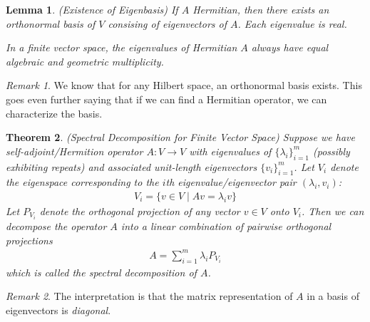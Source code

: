 \documentclass[12pt]{book}
\numberwithin{equation}{section} %
\theoremstyle{plain}
\newtheorem{thm}{Theorem}[section]
\newtheorem{lem}[thm]{Lemma}
\theoremstyle{definition}
\theoremstyle{remark}
\newtheorem*{rmk}{Remark}
\newcommand{\ra}{\rightarrow}
\begin{document}
\begin{lem}
\label{thm:eigenbasis}
\emph{(Existence of Eigenbasis)}
If $A$ Hermitian, then there exists an orthonormal basis of $V$
consising of eigenvectors of $A$. Each eigenvalue is real.

In a finite vector space, the eigenvalues of Hermitian $A$ always have
equal algebraic and geometric multiplicity.
\end{lem}
\begin{rmk}
We know that for any Hilbert space, an orthonormal basis exists.
This goes even further saying that if we can find a Hermitian operator,
we can characterize the basis.
\end{rmk}


\begin{thm}
\emph{(Spectral Decomposition for Finite Vector Space)}
Suppose we have self-adjoint/Hermition operator $A:V\ra V$ with
eigenvalues of $\{\lambda_i\}_{i=1}^m$ (possibly exhibiting repeats)
and associated unit-length eigenvectors $\{v_i\}_{i=1}^m$.
Let $V_i$ denote the eigenspace corresponding to the $i$th
eigenvalue/eigenvector pair $(\lambda_i,v_i)$:
\begin{align*}
  V_i =\{v\in V\;|\; Av=\lambda_i v\}
\end{align*}
Let $P_{V_i}$ denote the orthogonal projection of any vector $v\in V$
onto $V_i$.
Then we can decompose the operator $A$ into a linear combination of
pairwise orthogonal projections
\begin{align*}
  A = \sum_{i=1}^m \lambda_i P_{V_{i}}
\end{align*}
which is called the \emph{spectral decomposition} of $A$.
\end{thm}
\begin{rmk}
The interpretation is that the matrix representation of $A$ in a basis
of eigenvectors is \emph{diagonal}.
\end{rmk}
\end{document}
